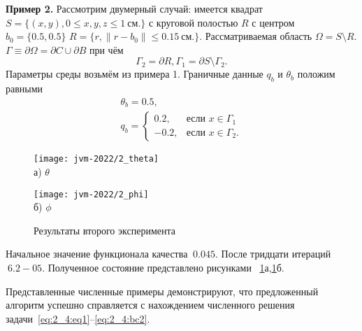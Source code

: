\textbf{Пример 2.}
Рассмотрим двумерный случай: имеется квадрат
$S = \{(x, y), 0 \leq x,y,z \leq 1~\text{см.}\}$ с
круговой полостью $R$ с центром $b_0 =\{0.5, 0.5\}$
$R = \{r, \| r - b_0 \| \leq 0.15~\text{см.} \}$.
Рассматриваемая область $\Omega = S \setminus R$.
$\Gamma \equiv \partial \Omega = \partial C \cup \partial B$ при чём
\[
    \Gamma_2 = \partial R,
    \Gamma_1 = \partial S \setminus \Gamma_2.
\]
Параметры среды возьмём из примера 1.
Граничные данные $q_b$ и $\theta_b$ положим равными
\begin{gather*}
    \theta_b = 0.5, \\
    q_b =
    \begin{cases}
        0.2, & \text{если } x \in \Gamma_1 \\
        -0.2, & \text{если } x \in \Gamma_2.
    \end{cases}
\end{gather*}

\begin{figure}[h!t]
    \begin{minipage}[b][][b]{0.49\linewidth}
        \centering
        \texttt{[image: jvm-2022/2\_theta]}
        \\ а) $\theta$
    \end{minipage}
    \hfill
    \begin{minipage}[b][][b]{0.49\linewidth}
        \centering
        \texttt{[image: jvm-2022/2\_phi]}
        \\ б) $\phi$
    \end{minipage}
    \caption{Результаты второго эксперимента}
    \label{fig:4_4:6}
\end{figure}
Начальное значение функционала качества $~0.045$.
После тридцати итераций $~6.2-05$.
Полученное состояние представлено рисунками ~\ref{fig:4_4:6}а,\ref{fig:4_4:6}б.


Представленные численные примеры демонстрируют,
что предложенный алгоритм успешно справляется
с нахождением численного решения задачи~\eqref{eq:2_4:eq1}--\eqref{eq:2_4:bc2}.

